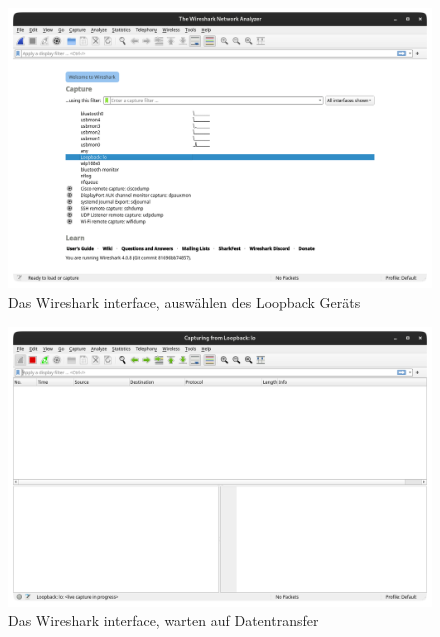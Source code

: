 \documentclass[12pt]{article}
\begin{document}
\begin{figure}[h]
	\centering
	\includegraphics[scale=0.3]{Bilder/Anlagen_1}
	\caption{Das Wireshark interface, auswählen des Loopback Geräts \cite{screenshots-self}}
	\label{fig:figure30}
\end{figure}

\begin{figure}[h]
	\centering
	\includegraphics[scale=0.3]{Bilder/Anlagen_2}
	\caption{Das Wireshark interface, warten auf Datentransfer \cite{screenshots-self}}
	\label{fig:figure31}
\end{figure}
\end{document}
